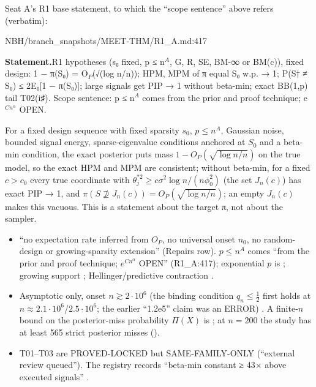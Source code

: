 Seat A's R1 base statement, to which the ``scope sentence'' above refers (verbatim):
\begin{stmt}{NBH/branch_snapshots/MEET-THM/R1_A.md:417}
\par\smallskip\noindent\textbf{Statement.}\enspace R1 hypotheses (s₀ fixed, p ≤ n$^{A}$, G, R, SE, BM-∞ or BM(c)), fixed design: 1 − π(S₀) = O$_{P}$(√(log n/n)); HPM, MPM of π equal S₀ w.p. → 1; P(S† ≠ S₀) ≤ 2E₀[1 − π(S₀)]; large signals get PIP → 1 without beta-min; exact BB(1,p) tail T02(i♯). Scope sentence: p ≤ n$^{A}$ comes from the prior and proof technique; e$^{Cn^{α}}$ OPEN.
\end{stmt}

\begin{plain}
For a fixed design sequence with fixed sparsity $s_0$, $p\le n^A$, Gaussian noise, bounded signal energy, sparse-eigenvalue conditions anchored at $S_0$ and a beta-min condition, the exact posterior puts mass $1-O_P(\sqrt{\log n/n})$ on the true model, so the exact HPM and MPM are consistent; without beta-min, for a fixed $c>c_0$ every true coordinate with $\theta_j^{*2}\ge c\sigma^2\log n/(n\phi_0^2)$ (the set $J_n(c)$) has exact PIP → 1, and $\pi(S\not\supseteq J_n(c))=O_P(\sqrt{\log n/n})$; an empty $J_n(c)$ makes this vacuous. This is a statement about the target π, not about the sampler.
\end{plain}

\begin{notproved}
\begin{itemize}
\item ``no expectation rate inferred from $O_P$, no universal onset $n_0$, no random-design or growing-sparsity extension'' (Repairs row). $p\le n^A$ comes ``from the prior and proof technique; $e^{Cn^{\alpha}}$ OPEN'' (R1\_A:417); exponential $p$ is ; growing support ; Hellinger/predictive contraction .
\item Asymptotic only, onset $n\gtrsim2\cdot10^{6}$ (the binding condition $q_n\le\tfrac12$ first holds at $n\approx2.1\cdot10^{6}$/$2.5\cdot10^{6}$; the earlier ``1.2e5'' claim was an ERROR) . A finite-$n$ bound on the posterior-miss probability $\Pi(X)$ is ; at $n=200$ the study has at least 565 strict posterior misses ().
\item T01–T03 are PROVED-LOCKED but SAME-FAMILY-ONLY (``external review queued''). The registry records ``beta-min constant ≥ 43× above executed signals'' .
\end{itemize}
\end{notproved}

